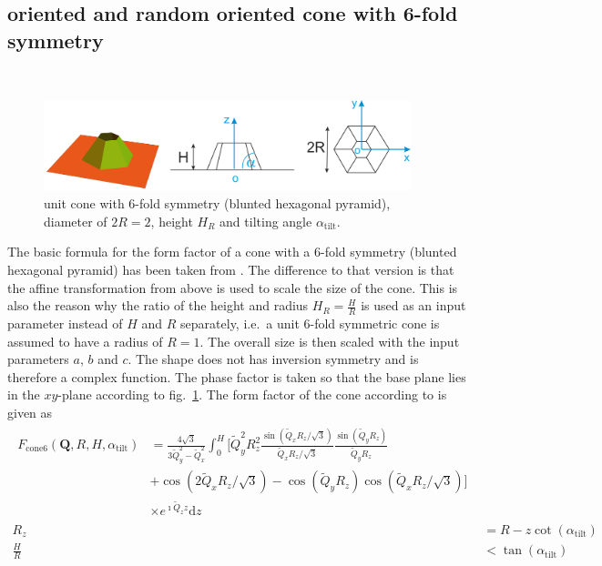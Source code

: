 \subsection{oriented and random oriented cone with 6-fold symmetry} ~\\

\begin{figure}[htb]
\begin{center}
\includegraphics[width=0.95\textwidth]{../images/form_factor/oriented_primitive_opbjects/cone6.png}
\end{center}
\caption{unit cone with 6-fold symmetry (blunted hexagonal pyramid), diameter of $2R=2$, height $H_R$ and tilting angle $\alpha_\mathrm{tilt}$.}
\label{fig:opo_cone6}
\end{figure}

The basic formula for the form factor of a cone with a 6-fold symmetry (blunted hexagonal pyramid) has been taken from \cite{Renaud2009}. The difference to that version is that the affine transformation from above is used to scale the size of the cone. This is also the reason why the ratio of the height and radius $H_R=\frac{H}{R}$ is used as an input parameter instead of $H$ and $R$ separately, i.e.\ a unit 6-fold symmetric cone is assumed to have a radius of $R=1$. The overall size is then scaled with the input parameters $a$, $b$ and $c$. The shape does not has inversion symmetry and is therefore a complex function. The phase factor is taken so that the base plane lies in the $xy$-plane according to fig.\ \ref{fig:opo_cone6}. The form factor of the cone according to \cite{Renaud2009} is given as
\begin{align}\label{eq:opo_cone6}
\begin{split}
   F_\mathrm{cone6}(\mathbf{Q},R,H,\alpha_\mathrm{tilt})
     & = \frac{4\sqrt{3}}{3\tilde{Q}_y^2-\tilde{Q}_x^2} \int_0^H \Bigg[\tilde{Q}_y^2R_z^2  \frac{\sin\left(\tilde{Q}_x R_z/\sqrt{3}\right)}{\tilde{Q}_x R_z/\sqrt{3}} \frac{\sin(\tilde{Q}_y R_z)}{\tilde{Q}_y R_z} \\
     &  + \cos\left(2\tilde{Q}_x R_z/\sqrt{3}\right) -\cos(\tilde{Q}_y R_z)\cos\left(\tilde{Q}_x R_z/\sqrt{3}\right) \Bigg] \\
     & \times e^{\imath \tilde{Q}_z z} \mathrm{d}z
\end{split} \\
  R_z &=R-z\cot(\alpha_\mathrm{tilt}) \\
  \frac{H}{R} &< \tan(\alpha_\mathrm{tilt})
\end{align}

